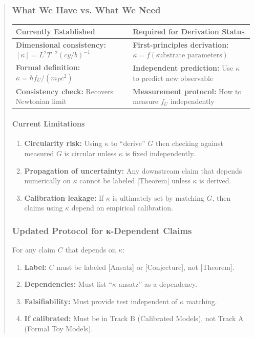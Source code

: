 \documentclass[11pt,titlepage]{article}
\begin{document}
\begin{abstract}
\subsubsection{What We Have vs. What We Need}

\begin{tabular}{p{}p{}}
\textbf{Currently Established} & \textbf{Required for Derivation Status} \\ \hline
\textbf{Dimensional consistency:} $[\kappa] = L^2 T^{-2} (cy/b)^{-1}$ & \textbf{First-principles derivation:} $\kappa = f(\text{substrate parameters})$ \\
\textbf{Formal definition:} $\kappa = \hbar f_U / (m_P c^2)$ & \textbf{Independent prediction:} Use $\kappa$ to predict new observable \\
\textbf{Consistency check:} Recovers Newtonian limit & \textbf{Measurement protocol:} How to measure $f_U$ independently \\
\end{tabular}

\paragraph{Current Limitations}
\begin{enumerate}
\item \textbf{Circularity risk:} Using $\kappa$ to ``derive'' $G$ then checking against measured $G$ is circular unless $\kappa$ is fixed independently.

\item \textbf{Propagation of uncertainty:} Any downstream claim that depends numerically on $\kappa$ cannot be labeled [Theorem] unless $\kappa$ is derived.

\item \textbf{Calibration leakage:} If $\kappa$ is ultimately set by matching $G$, then claims using $\kappa$ depend on empirical calibration.
\end{enumerate}

\subsubsection{Updated Protocol for κ-Dependent Claims}

\begin{tcolorbox}[colback=yellow!5!white,colframe=yellow!75!black,title=Protocol: Handling κ-Dependent Claims]
For any claim $C$ that depends on $\kappa$:
\begin{enumerate}
\item \textbf{Label:} $C$ must be labeled [Ansatz] or [Conjecture], not [Theorem].
\item \textbf{Dependencies:} Must list ``$\kappa$ ansatz'' as a dependency.
\item \textbf{Falsifiability:} Must provide test independent of $\kappa$ matching.
\item \textbf{If calibrated:} Must be in Track B (Calibrated Models), not Track A (Formal Toy Models).
\end{enumerate}
\end{tcolorbox}


\end{abstract}
\end{document}
